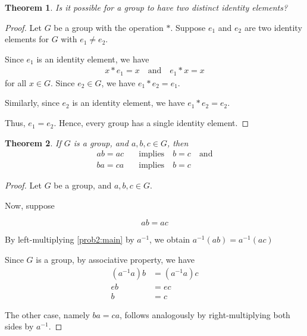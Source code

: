 \documentclass{article}
\newtheorem{theorem}{Theorem}
\begin{document}
\begin{theorem}
Is it possible for a group to have two distinct identity elements?
\end{theorem}

\begin{proof}
Let $G$ be a group with the operation $*$. Suppose $e_1$ and $e_2$ are two
identity elements for $G$ with $e_1 \neq e_2$.

Since $e_1$ is an identity element, we have
\begin{gather*}
x*e_1=x \quad \text{and} \quad e_1*x=x
\end{gather*}
for all $x \in G$. Since $e_2 \in G$, we have $e_1*e_2=e_1$.

Similarly, since $e_2$ is an identity element, we have
$e_1*e_2=e_2$.

Thus, $e_1=e_2$. Hence, every group has a single identity element.
\end{proof}

\begin{theorem}
If $G$ is a group, and $a,b,c \in G$, then
\begin{align*}
\tag{i} ab=ac \quad &\text{implies} \quad b=c \quad \text{and}\\
\tag{ii} ba=ca \quad &\text{implies} \quad b=c
\end{align*}
\end{theorem}

\begin{proof}
Let $G$ be a group, and $a,b,c \in G$.

Now, suppose

\begin{equation}
\label{prob2:main}
ab=ac
\end{equation}

By left-multiplying \eqref{prob2:main} by $a^{-1}$, we obtain
$a^{-1}(ab)=a^{-1}(ac)$

Since $G$ is a group, by associative property, we have
\begin{align*}
(a^{-1}a)b&=(a^{-1}a)c\\
eb&=ec\\
b&=c
\end{align*}

The other case, namely $ba=ca$, follows analogously by
right-multiplying both sides by $a^{-1}$.
\end{proof}
\end{document}
